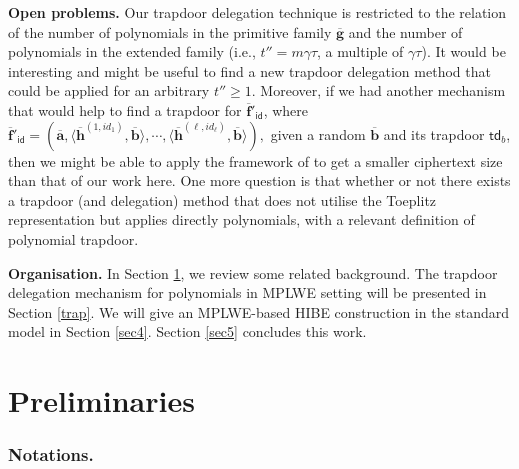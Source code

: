 \documentclass[runningheads]{llncs}
\begin{document}
 \noindent\textbf{Open problems.} Our trapdoor delegation technique is restricted to the relation of the number of polynomials in the primitive family $\overline{\textbf{g}}$ and the number of polynomials in the extended family (i.e., $t''=m \gamma \tau$, a multiple of $\gamma \tau$).  It would be interesting and might be useful to find a new trapdoor delegation method that could be applied for an arbitrary $t''\geq 1$. Moreover, 
 if we had another mechanism that would help to find a trapdoor for $\overline{\mathbf{f}}'_{\mathsf{id}}$, where $\overline{\mathbf{f}}'_{\mathsf{id}}=(\overline{\mathbf{a}}, \langle \overline{\mathbf{h}}^{(1,id_1)}, \overline{\mathbf{b}} \rangle ,  \cdots, \langle \overline{\mathbf{h}}^{(\ell,id_{\ell})}, \overline{\mathbf{b}} \rangle ),$
 given a random $\overline{\mathbf{b}}$ and its trapdoor $\mathsf{td}_b$, then we might be able to apply the  framework of \cite{ABB10} to get a smaller ciphertext size than that of our work here.    One more question is that whether or not there
exists a trapdoor (and delegation) method that does not utilise the Toeplitz representation
but applies directly polynomials, with a relevant definition of polynomial trapdoor.

 \noindent\textbf{Organisation.}  In Section \ref{sec2}, we review some related background. The trapdoor delegation mechanism for polynomials in MPLWE setting will be presented in Section \ref{trap}.  We will give an MPLWE-based HIBE construction in the standard model in Section \ref{sec4}. Section \ref{sec5} concludes this work.
   
\section{Preliminaries} \label{sec2}

\subsubsection{Notations.} 
\end{document}
